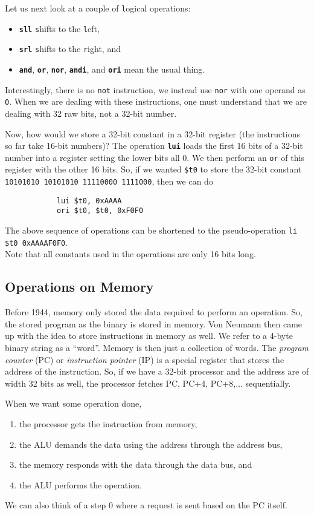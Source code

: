 \documentclass{article}
\begin{document}
		Let us next look at a couple of \texttt{l}ogical operations:
		\begin{itemize}
			\item \textbf{\texttt{sll}} \texttt{s}hifts to the \texttt{l}eft,
			\item \textbf{\texttt{srl}} \texttt{s}hifts to the \texttt{r}ight, and
			\item \textbf{\texttt{and}}, \textbf{\texttt{or}}, \textbf{\texttt{nor}}, \textbf{\texttt{andi}}, and \textbf{\texttt{ori}} mean the usual thing.
		\end{itemize}
		Interestingly, there is no \texttt{not} instruction, we instead use \texttt{nor} with one operand as \texttt{0}. When we are dealing with these instructions, one must understand that we are dealing with 32 raw bits, not a 32-bit number. 

		Now, how would we store a 32-bit constant in a 32-bit register (the instructions so far take 16-bit numbers)? The operation \textbf{\texttt{lui}} loads the first 16 bits of a 32-bit number into a register setting the lower bits all 0. We then perform an \texttt{or} of this register with the other 16 bits. So, if we wanted \texttt{\$t0} to store the 32-bit constant \texttt{10101010 10101010 11110000 1111000}, then we can do
		\begin{verbatim}
			lui $t0, 0xAAAA
			ori $t0, $t0, 0xF0F0
		\end{verbatim}
		The above sequence of operations can be shortened to the pseudo-operation \texttt{li \$t0 0xAAAAF0F0}.\\
		Note that all constants used in the operations are only 16 bits long.

	\subsection{Operations on Memory}

		Before 1944, memory only stored the data required to perform an operation. So, the stored program as the binary is stored in memory. Von Neumann then came up with the idea to store instructions in memory as well. We refer to a 4-byte binary string as a  ``word''. Memory is then just a collection of words. The \textit{program counter} (PC) or \textit{instruction pointer} (IP) is a special register that stores the address of the instruction. So, if we have a 32-bit processor and the address are of width 32 bits as well, the processor fetches PC, PC+4, PC+8,$\ldots$ sequentially.

		When we want some operation done,
		\begin{enumerate}
			\item the processor gets the instruction from memory,
			\item the ALU demands the data using the address through the address bus,
			\item the memory responds with the data through the data bus, and
			\item the ALU performs the operation.
		\end{enumerate}
		We can also think of a step 0 where a request is sent based on the PC itself.
\end{document}

